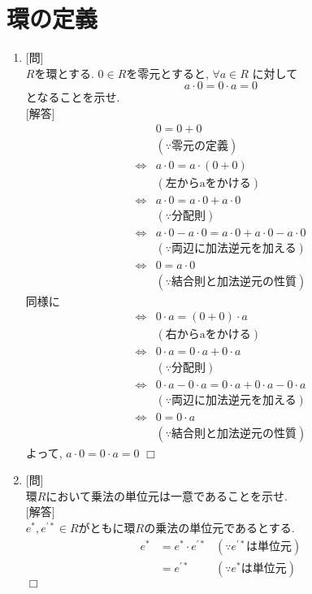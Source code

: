 \documentclass{jsarticle}	       %
\begin{document}
	\section{環の定義}
		\begin{enumerate}[label=\fbox{\arabic*}]
			\item
				{[問]}\\
					$R$を環とする. $0 \in R$を零元とすると, $\forall a \in R$ に対して
					\[ a \cdot 0 = 0 \cdot a = 0 \] となることを示せ. \\
				{[解答]}\\
					\begin{align*}
						& 0 = 0 + 0 \\
						& (\because 零元の定義) \\
						\Leftrightarrow & a \cdot 0 = a \cdot ( 0 + 0 )\\
						                & (\text{左からaをかける})\\
						\Leftrightarrow & a \cdot 0 = a \cdot 0 + a \cdot 0\\
						                & (\because \text{分配則})\\
						\Leftrightarrow & a \cdot 0 - a \cdot 0 = a \cdot 0 + a \cdot 0 - a \cdot 0\\
						                & (\because \text{両辺に加法逆元を加える})\\
						\Leftrightarrow & 0 = a \cdot 0\\
						                & (\because \text{結合則と加法逆元の性質})
					\end{align*}
					同様に
					\begin{align*}
						\Leftrightarrow & 0 \cdot a = (0 + 0) \cdot a\\
						                & (\text{右からaをかける})\\
						\Leftrightarrow & 0 \cdot a = 0 \cdot a + 0 \cdot a\\
						                & (\because \text{分配則})\\
						\Leftrightarrow & 0 \cdot a - 0 \cdot a = 0 \cdot a + 0 \cdot a - 0 \cdot a\\
						                & (\because \text{両辺に加法逆元を加える})\\
						\Leftrightarrow & 0 = 0 \cdot a\\
						                & (\because \text{結合則と加法逆元の性質})
					\end{align*}
					よって, $a \cdot 0 = 0 \cdot a = 0$ \hfill $\Box$

			\item
				{[問]}\\
					環$R$において乗法の単位元は一意であることを示せ.\\
				{[解答]}\\
					$e^{*}, e^{'*} \in R$がともに環$R$の乗法の単位元であるとする.
					\begin{align*}
						e^{*} &= e^{*} \cdot e^{'*} & (\because e^{'*} \text{は単位元})\\
									&= e^{'*} & (\because e^{*} \text{は単位元})
					\end{align*}
					\hfill $\Box$


\end{enumerate}
\end{document}
